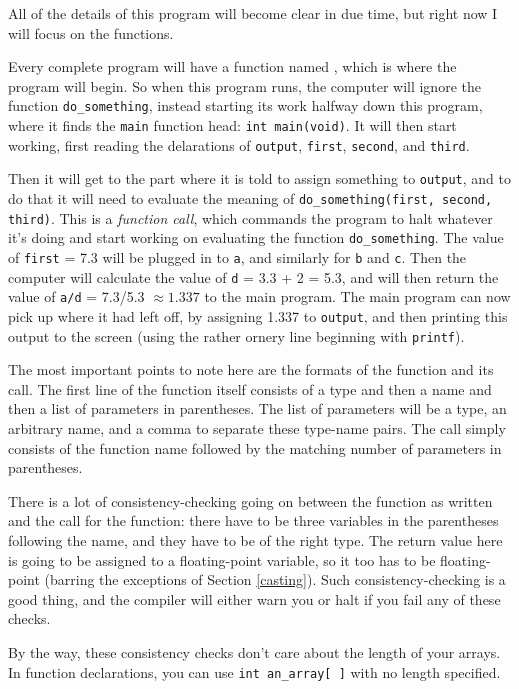 \documentclass[12pt]{article}
\makeatletter
\def\ttind#1{\index{#1@{\tt #1}}{\tt #1}}
\makeatother
\begin{document}

All of the details of this program will become clear in due time, but
right now I will focus on the functions.

Every complete program will have a function named \ttind{main}, which
is where the program will begin.  So when this program runs, the computer will
ignore the function {\tt do\_something}, instead starting its work halfway
down this program, where it finds the {\tt main} function head: {\tt int main(void)}. 
It will then start working, first reading the
delarations of {\tt output}, {\tt first}, {\tt second}, and {\tt third}.

Then it will get to the part where it is told to assign something to
{\tt output}, and to do that it will need to evaluate  the meaning of
{\tt do\_something(first, second, third)}. This is a {\em function call}, which commands the program to
halt whatever it's doing and start working on evaluating the function {\tt do\_something}.
The value of {\tt first} = 7.3 will
be plugged in to {\tt a}, and similarly for {\tt b} and {\tt c}. Then
the computer will calculate the value of {\tt d} = 3.3 + 2 = 5.3, and
will then return the value of {\tt a/d} = 7.3/5.3 $\approx 1.337$ to the
main program. The main program can now pick up where it had left off,
by assigning 1.337 to {\tt output}, and then printing this output to the
screen (using the rather ornery line beginning with {\tt printf}).

The most important points to note here are the formats of the function
and its call. The first line of the function itself consists of a type
and then a name and then a list of parameters in parentheses. 
The list of parameters will be a type, an arbitrary name, and a comma
to separate these type-name pairs.  The call simply consists of the
function name followed by the matching number of parameters in parentheses.

There is a lot of consistency-checking going on between the function as written
and the call for the function: there have to be three variables in the parentheses following the name,
and they have to be of the right type. The return value here is going to be assigned to a floating-point
variable, so it too has to be floating-point (barring the exceptions of Section \ref{casting}). Such
consistency-checking is a good thing, and the compiler will either warn you or halt if you fail any
of these checks.

By the way, these consistency checks don't care about the length of
your arrays. In function declarations, you can use {\tt int an\_array[ ]}
with no length specified.  
\end{document}
